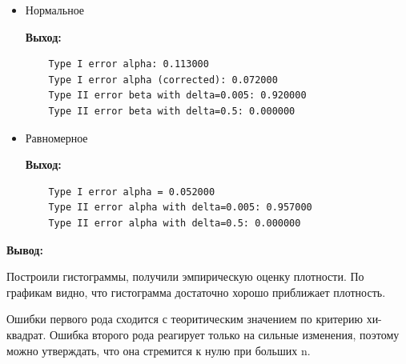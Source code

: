 \documentclass{article}
\begin{document}
\begin{itemize}
	\item Нормальное
	
	
	{\bf Выход:}
	
	\begin{lstlisting}
	Type I error alpha: 0.113000
	Type I error alpha (corrected): 0.072000
	Type II error beta with delta=0.005: 0.920000
	Type II error beta with delta=0.5: 0.000000\end{lstlisting}
	
	\item Равномерное
	
	
	{\bf Выход:}
	
	\begin{lstlisting}
	Type I error alpha = 0.052000
	Type II error alpha with delta=0.005: 0.957000
	Type II error alpha with delta=0.5: 0.000000\end{lstlisting}
\end{itemize}

{\bf  Вывод:}

Построили гистограммы, получили эмпирическую оценку плотности. По графикам видно, что гистограмма достаточно хорошо приближает плотность.

Ошибки первого рода сходится с теоритическим значением по критерию хи-квадрат. Ошибка
второго рода реагирует только на сильные изменения, поэтому можно утверждать, что она
стремится к нулю при больших n.
\end{document}
